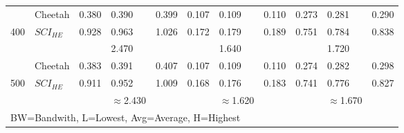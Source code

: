 \begin{tabular}{lllllllllll}
           & Cheetah & 0.380  & 0.390    & 0.399 & 0.107         & 0.109           & 0.110         & 0.273         & 0.281           & 0.290         \\
400        & $SCI_{HE}$ & 0.928  & 0.963    & 1.026 & 0.172         & 0.179           & 0.189         & 0.751         & 0.784           & 0.838         \\ \cline{3-11} 
           &         &        & 2.470    &       &               & 1.640           &               &               & 1.720           &               \\ \hline
           & Cheetah & 0.383  & 0.391    & 0.407 & 0.107         & 0.109           & 0.110         & 0.274         & 0.282           & 0.298         \\
500        & $SCI_{HE}$ & 0.911  & 0.952    & 1.009 & 0.168         & 0.176           & 0.183         & 0.741         & 0.776           & 0.827         \\ \cline{2-11} 
           &         &        & $\approx$2.430    &       &               & $\approx$1.620           &               &               & $\approx$1.670           &               \\ \hline
\multicolumn{11}{l}{BW=Bandwith, L=Lowest, Avg=Average, H=Highest}                                                                                  
\end{tabular}